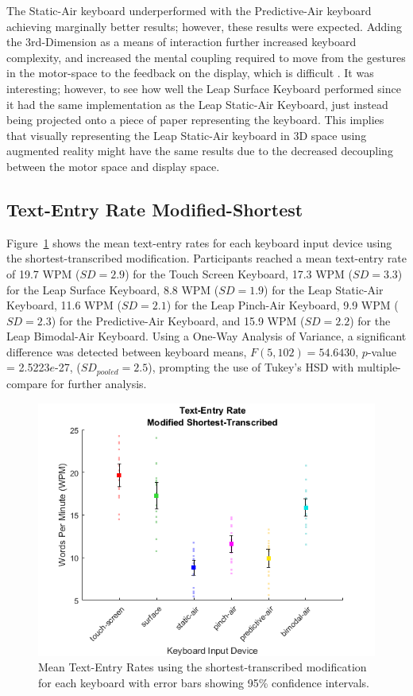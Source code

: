 The Static-Air keyboard underperformed with the Predictive-Air keyboard achieving marginally better results; however, these results were expected. Adding the 3rd-Dimension as a means of interaction further increased keyboard complexity, and increased the mental coupling required to move from the gestures in the motor-space to the feedback on the display, which is difficult \cite{ref_vulture,ref_stimulus_response_compatibility}. It was interesting; however, to see how well the Leap Surface Keyboard performed since it had the same implementation as the Leap Static-Air Keyboard, just instead being projected onto a piece of paper representing the keyboard. This implies that visually representing the Leap Static-Air keyboard in 3D space using augmented reality might have the same results due to the decreased decoupling between the motor space and display space.

\subsection{Text-Entry Rate Modified-Shortest}
Figure~\ref{fig_textentry_short_mean} shows the mean text-entry rates for each keyboard input device using the shortest-transcribed modification. Participants reached a mean text-entry rate of 19.7 WPM ($SD = 2.9$) for the Touch Screen Keyboard, 17.3 WPM ($SD = 3.3$) for the Leap Surface Keyboard, 8.8 WPM ($SD = 1.9$) for the Leap Static-Air Keyboard, 11.6 WPM ($SD = 2.1$) for the Leap Pinch-Air Keyboard, 9.9 WPM ($SD = 2.3$) for the Predictive-Air Keyboard, and 15.9 WPM ($SD = 2.2$) for the Leap Bimodal-Air Keyboard. Using a One-Way Analysis of Variance, a significant difference was detected between keyboard means, $F(5, 102) = 54.6430$, $p$-value = 2.5223$e$-27, ($SD_{pooled} = 2.5$), prompting the use of Tukey's HSD with multiple-compare for further analysis.

\begin{figure}[h]
	\centering
	\includegraphics{fig_textentry_short_mean}
	\caption[Mean Text-Entry Rates for Modified-Shortest]{Mean Text-Entry Rates using the shortest-transcribed modification for each keyboard with error bars showing 95\% confidence intervals.}
	\label{fig_textentry_short_mean}
\end{figure}

